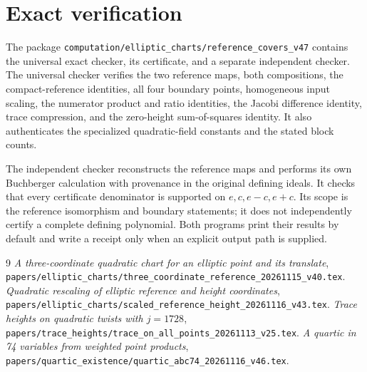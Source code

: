 \documentclass[11pt,a4paper]{article}
\begin{document}
\section{Exact verification}\label{sec:verification}
The package
\nolinkurl{computation/elliptic_charts/reference_covers_v47}
contains the universal exact checker, its certificate, and a separate
independent checker. The universal checker verifies the two reference
maps, both compositions, the compact-reference identities, all four
boundary points, homogeneous input scaling, the numerator product and
ratio identities, the Jacobi difference identity, trace compression,
and the zero-height sum-of-squares identity. It also authenticates
the specialized quadratic-field constants and the stated block counts.

The independent checker reconstructs the reference maps and performs
its own Buchberger calculation with provenance in the original
defining ideals. It checks that every certificate denominator is
supported on $e,c,e-c,e+c$. Its scope is the reference isomorphism
and boundary statements; it does not independently certify a complete
defining polynomial. Both programs print their results by default and
write a receipt only when an explicit output path is supplied.

\begin{thebibliography}{9}
\emph{A three-coordinate quadratic chart for an elliptic point and its translate},
\nolinkurl{papers/elliptic_charts/three_coordinate_reference_20261115_v40.tex}.
\emph{Quadratic rescaling of elliptic reference and height coordinates},
\nolinkurl{papers/elliptic_charts/scaled_reference_height_20261116_v43.tex}.
\emph{Trace heights on quadratic twists with $j=1728$},
\nolinkurl{papers/trace_heights/trace_on_all_points_20261113_v25.tex}.
\emph{A quartic in 74 variables from weighted point products},
\nolinkurl{papers/quartic_existence/quartic_abc74_20261116_v46.tex}.
\end{thebibliography}
\end{document}
